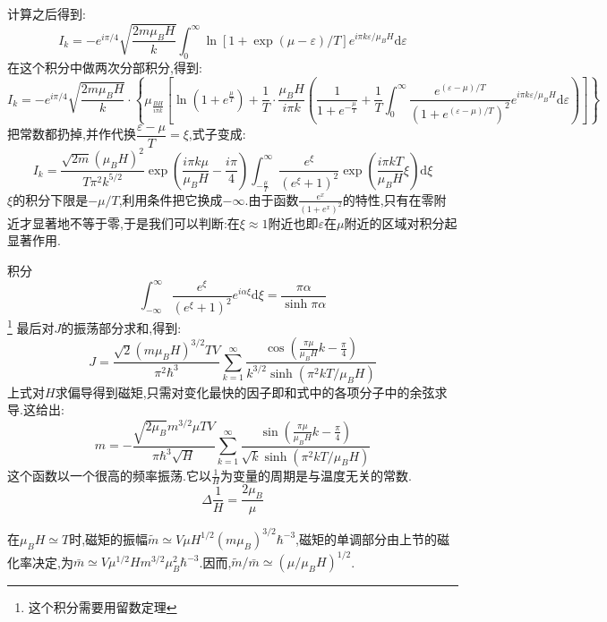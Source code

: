     计算之后得到:
    \[I_k=-e^{i\pi / 4}\sqrt{\frac{2m\mu_BH}{k}}\int_{0}^{\infty} \ln\left[ 1+\exp\left( \mu-\varepsilon \right) /T \right] e^{i\pi k \varepsilon /\mu_BH} \mathrm{d}\varepsilon\]
    在这个积分中做两次分部积分,得到:
    \[I_k=-e^{i\pi / 4}\sqrt{\frac{2m\mu_BH}{k}}\cdot\left\{ \mu_\frac{BH}{i\pi k}\left[ \ln(1+e^{\frac{\mu}{T}})+\frac{1}{T}\cdot \frac{\mu_BH}{i\pi k}\left( \frac{1}{1+e^{-\frac{\mu}{T}}}+\frac{1}{T}\int_{0}^{\infty} \frac{e^{(\varepsilon-\mu)/T}}{(1+e^{(\varepsilon-\mu)/T})^{2}}e^{i \pi k \varepsilon / \mu_BH} \mathrm{d}\varepsilon \right)  \right]  \right\} \]
    把常数都扔掉,并作代换$\dfrac{\varepsilon-\mu}{T}=\xi$,式子变成:
    \[I_k=\frac{\sqrt{2m}(\mu_BH)^{2}}{T\pi^{2}k^{5 / 2}}\exp(\frac{i\pi k\mu}{\mu_BH}-\frac{i \pi}{4})\int_{-\frac{\mu}{T}}^{\infty} \frac{e^{\xi}}{(e^{\xi}+1)^{2}}\exp(\frac{i\pi k T}{\mu_BH}\xi) \mathrm{d}\xi\]
    $\xi$的积分下限是$-\mu / T$,利用条件把它换成$-\infty$.由于函数$\frac{e^{x}}{(1+e^{x})^{2}}$的特性,只有在零附近才显著地不等于零,于是我们可以判断:在$\xi\approx 1$附近也即$\varepsilon$在$\mu$附近的区域对积分起显著作用.

    积分 \[\int_{-\infty}^{\infty} \frac{e^{\xi}}{(e^{\xi}+1)^{2}} e^{i\alpha\xi}\mathrm{d}\xi=\frac{\pi \alpha}{\sinh \pi\alpha}\]
    \footnote{这个积分需要用留数定理}
    最后对$J$的振荡部分求和,得到:
    \begin{equation}
      J=\frac{\sqrt{2}(m\mu_BH)^{3 / 2}TV}{\pi^{2}\hbar^{3}}\sum_{k=1}^{\infty}\frac{\cos(\frac{\pi \mu}{\mu_BH}k-\frac{\pi}{4})}{k^{3 / 2}\sinh (\pi^{2}kT /\mu_BH)}
    \end{equation}
    上式对$H$求偏导得到磁矩,只需对变化最快的因子即和式中的各项分子中的余弦求导.这给出:
    \begin{equation}
      m=-\frac{\sqrt{2\mu_B}m^{3 /2}\mu TV}{\pi\hbar^{3}\sqrt{H}}\sum_{k=1}^{\infty}\frac{\sin(\frac{\pi \mu}{\mu_BH}k-\frac{\pi}{4})}{\sqrt{k}\sinh(\pi^{2}kT / \mu_BH)}
    \end{equation}
    这个函数以一个很高的频率振荡.它以$\frac{1}{H}$为变量的周期是与温度无关的常数.
    \begin{equation}
      \Delta \frac{1}{H}=\frac{2\mu_B}{\mu}
    \end{equation}

    在$\mu_BH \simeq T$时,磁矩的振幅$\tilde{m}\simeq V\mu H^{1 /2}(m\mu_B)^{3 /2} \hbar^{-3}$,磁矩的单调部分由上节的磁化率决定,为$\bar{m}\simeq V \mu^{1 /2} H m^{3 /2}\mu_B^{2}\hbar^{-3}$.因而,$\tilde{m} / \bar{m}\simeq (\mu / \mu_BH)^{1 /2}$.



